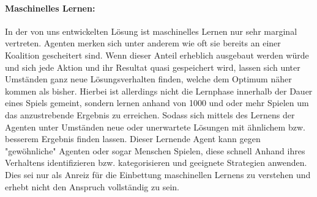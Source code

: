 \documentclass[fleqn,10pt]{SelfArx} %
\begin{document}
\paragraph{Maschinelles Lernen:} 
In der von uns entwickelten Lösung ist maschinelles Lernen nur sehr marginal vertreten. Agenten merken sich unter anderem wie oft sie bereits an einer Koalition gescheitert sind. Wenn dieser Anteil erheblich ausgebaut werden würde und sich jede Aktion und ihr Resultat quasi gespeichert wird, lassen sich unter Umständen ganz neue Lösungsverhalten finden, welche dem Optimum näher kommen als bisher. Hierbei ist allerdings nicht die Lernphase innerhalb der Dauer eines Spiels gemeint, sondern lernen anhand von 1000 und oder mehr Spielen um das anzustrebende Ergebnis zu erreichen. Sodass sich mittels des Lernens der Agenten unter Umständen neue oder unerwartete Lösungen mit ähnlichem bzw. besserem Ergebnis finden lassen. Dieser Lernende Agent kann gegen "gewöhnliche" Agenten oder sogar Menschen Spielen, diese schnell Anhand ihres Verhaltens identifizieren bzw. kategorisieren und geeignete Strategien anwenden. Dies sei nur als Anreiz für die Einbettung maschinellen Lernens zu verstehen und erhebt nicht den Anspruch vollständig zu sein.
\end{document}
